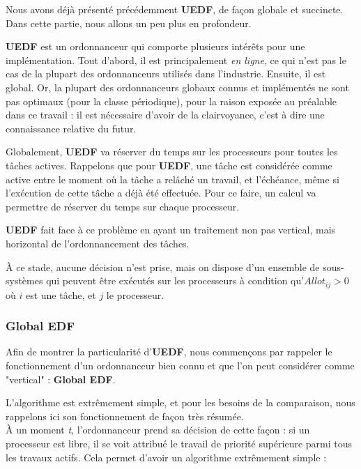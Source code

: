 	
	
	Nous avons déjà présenté précédemment \textbf{UEDF}, de façon globale et succincte. 
	Dans cette partie, nous allons un peu plus en profondeur.
	
	\textbf{UEDF} est un ordonnanceur qui comporte plusieurs intérêts pour une implémentation.
	Tout d'abord, il est principalement \textit{en ligne}, ce qui n'est pas le cas de 
	la plupart des ordonnanceurs utilisés dans l'industrie.
	Ensuite, il est global. Or, la plupart des ordonnanceurs 
	globaux connus et implémentés ne sont pas optimaux (pour la classe périodique), pour la
	raison exposée au préalable dans ce travail : il est nécessaire d'avoir de la clairvoyance, 
	c'est à dire une connaissance relative du futur.\newline
	
	Globalement, \textbf{UEDF} va réserver du temps sur les processeurs pour toutes les tâches actives.
	Rappelons que pour \textbf{UEDF}, une tâche est considérée comme active entre le moment où la tâche 
	a relâché un travail, et l'échéance, même si l'exécution de cette tâche a déjà été effectuée.
	Pour ce faire, un calcul va permettre de réserver du temps sur chaque processeur.
	
	\textbf{UEDF} fait face à ce problème en ayant un traitement non pas vertical, mais horizontal
de l'ordonnancement des tâches.	

	À ce stade, aucune décision n'est prise, mais on dispose d'un ensemble de sous-systèmes qui peuvent 
	être exécutés sur les processeurs à condition qu'$Allot_{ij} > 0$ où $i$ est une tâche, 
	et $j$ le processeur.
	

		\subsubsection{Global EDF}
		Afin de montrer la particularité d'\textbf{UEDF}, nous commençons par rappeler le fonctionnement 
		d'un ordonnanceur bien connu et que l'on peut considérer comme "vertical" : \textbf{Global EDF}. 
		
		L'algorithme est extrêmement simple, et pour les besoins de la comparaison, nous rappelons 
		ici son fonctionnement de façon très résumée.\\
		À un moment \textit{t}, l'ordonnanceur prend sa décision de cette façon :
		si un processeur est libre, il se voit attribué le travail de priorité supérieure parmi 
		tous les travaux actifs. Cela permet d'avoir un algorithme extrêmement simple :\newline
		
